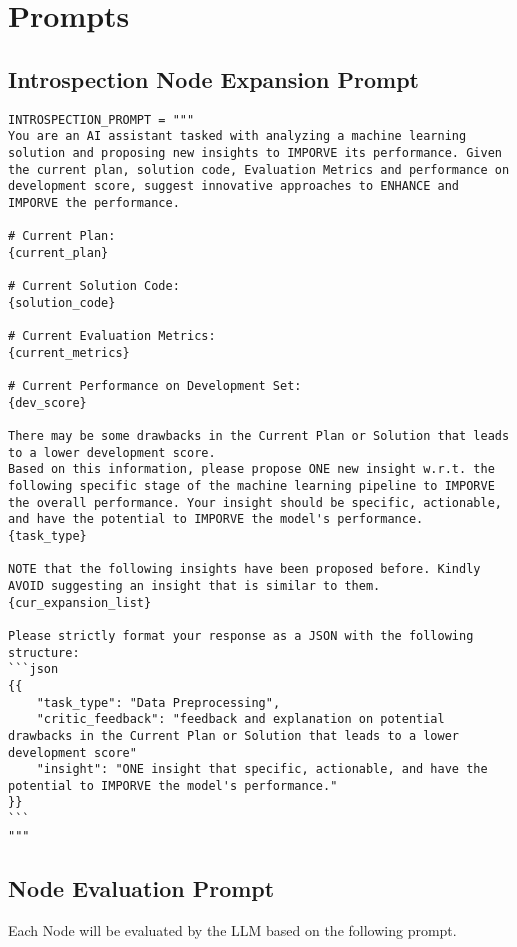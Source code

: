 \newpage
\section{Prompts}
\label{app:prompt}

\subsection{Introspection Node Expansion Prompt}
\begin{lstlisting}[style=pythonstyle]
INTROSPECTION_PROMPT = """
You are an AI assistant tasked with analyzing a machine learning solution and proposing new insights to IMPORVE its performance. Given the current plan, solution code, Evaluation Metrics and performance on development score, suggest innovative approaches to ENHANCE and IMPORVE the performance.

# Current Plan:
{current_plan}

# Current Solution Code:
{solution_code}

# Current Evaluation Metrics:
{current_metrics}

# Current Performance on Development Set: 
{dev_score}

There may be some drawbacks in the Current Plan or Solution that leads to a lower development score.
Based on this information, please propose ONE new insight w.r.t. the following specific stage of the machine learning pipeline to IMPORVE the overall performance. Your insight should be specific, actionable, and have the potential to IMPORVE the model's performance.
{task_type}

NOTE that the following insights have been proposed before. Kindly AVOID suggesting an insight that is similar to them.
{cur_expansion_list}

Please strictly format your response as a JSON with the following structure:
```json
{{
    "task_type": "Data Preprocessing",
    "critic_feedback": "feedback and explanation on potential drawbacks in the Current Plan or Solution that leads to a lower development score"
    "insight": "ONE insight that specific, actionable, and have the potential to IMPORVE the model's performance."
}}
```
"""
\end{lstlisting}

\subsection{Node Evaluation Prompt}
Each Node will be evaluated by the LLM based on the following prompt.
\label{app:llm_evaluation_schema}

